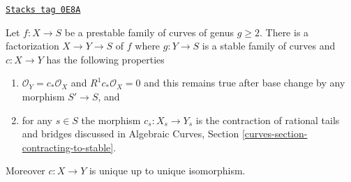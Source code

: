 \begin{lemma}
\label{moduli-curves-lemma-contract-prestable-to-stable}
\href{https://stacks.math.columbia.edu/tag/0E8A}{\texttt{Stacks tag 0E8A}}

Let $f : X \to S$ be a prestable family of curves of genus $g \geq 2$.
There is a factorization $X \to Y \to S$ of $f$ where $g : Y \to S$
is a stable family of curves and $c : X \to Y$ has the following
properties
\begin{enumerate}
\item $\mathcal{O}_Y = c_*\mathcal{O}_X$ and $R^1c_*\mathcal{O}_X = 0$
and this remains true after base change by any morphism $S' \to S$, and
\item for any $s \in S$ the morphism $c_s : X_s \to Y_s$ is the
contraction of rational tails and bridges discussed in
Algebraic Curves, Section \ref{curves-section-contracting-to-stable}.
\end{enumerate}
Moreover $c : X \to Y$ is unique up to unique isomorphism.
\end{lemma}


